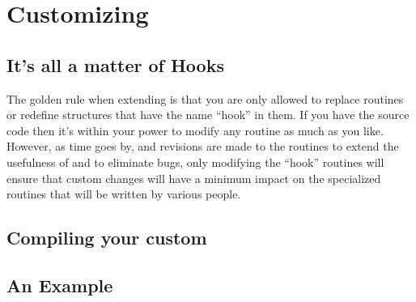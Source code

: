 \chapter{Customizing \tao}
\label{c:custom_tao}

\section{It's all a matter of Hooks}

The golden rule when extending \tao is that you are only allowed to replace
routines or redefine structures that have the name ``hook'' in them. 
If you have the source code then it's within your power to modify any routine as much 
as you like. However, as time
goes by, and revisions are made to the \tao routines to extend the
usefulness of \tao and to eliminate bugs, only modifying the ``hook'' routines
will ensure that custom changes will
have a minimum impact on the specialized routines that will be written
by various people. 

\section{Compiling your custom \tao}


\section{An Example}


